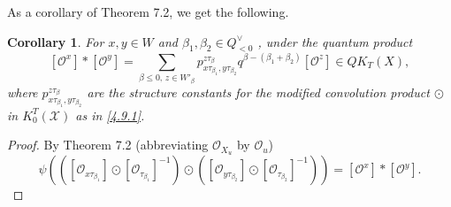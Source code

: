 \documentclass{article}
\newtheorem{corollary}[theorem]{Corollary}
\def\X{\mathcal{X}}
\def\ref#1{#1}
\begin{document}
As a corollary of Theorem \ref{7.2}, we get the following. 
\begin{corollary} \label{7.3} For $x,y \in W$ and $\beta_1, \beta_2 \in Q_{<0}^\vee $ , under the quantum product
$$
\left[ \mathcal{O}^x\right] * \left[ \mathcal{O}^y\right] = \sum_{\beta\leq 0, \, z\in W'_\beta} p_{x\tau_{\beta_1},y \tau_{\beta_2}}^{z\tau_\beta}  q^{\beta- \left( \beta_1+\beta_2\right)} \left[\mathcal{O}^z\right] \in QK_T(X),
$$
where $p_{x\tau_{\beta_1},y \tau_{\beta_2}}^{z\tau_\beta}$ are the structure constants for the modified convolution product $\odot$ in $K_0^T \left(\X\right)$ as in  \eqref{4.9.1}. 
\end{corollary}


\begin{proof}
By Theorem 7.2 (abbreviating $\mathcal{O}_{X_u}$ by $\mathcal{O}_u$)
\begin{equation}\label{7.3.1}
\psi \left(( \left[ \mathcal{O}_{x\tau _{\beta_1}}\right] \odot  \left[ \mathcal{O}_{\tau _{\beta_1}}\right]^{-1}) \odot ( \left[ \mathcal{O}_{y\tau _{\beta_2}}\right] \odot \left[\mathcal{O}_{\tau_{\beta_2}}\right]^{-1})\right) 
= \left[ \mathcal{O}^x\right] * \left[ \mathcal{O}^y\right] .
\end{equation}



\end{proof}
\end{document}
